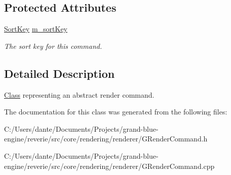 \subsection*{Protected Attributes}
\begin{DoxyCompactItemize}
\item 
\mbox{\label{classrev_1_1_render_command_a9c71d781e931b70aa460aea1646216a7}} 
\mbox{\hyperlink{classrev_1_1_sort_key}{Sort\+Key}} \mbox{\hyperlink{classrev_1_1_render_command_a9c71d781e931b70aa460aea1646216a7}{m\+\_\+sort\+Key}}
\begin{DoxyCompactList}\small\item\em The sort key for this command. \end{DoxyCompactList}\end{DoxyCompactItemize}


\subsection{Detailed Description}
\mbox{\hyperlink{struct_class}{Class}} representing an abstract render command. 

The documentation for this class was generated from the following files\+:\begin{DoxyCompactItemize}
\item 
C\+:/\+Users/dante/\+Documents/\+Projects/grand-\/blue-\/engine/reverie/src/core/rendering/renderer/G\+Render\+Command.\+h\item 
C\+:/\+Users/dante/\+Documents/\+Projects/grand-\/blue-\/engine/reverie/src/core/rendering/renderer/G\+Render\+Command.\+cpp\end{DoxyCompactItemize}
